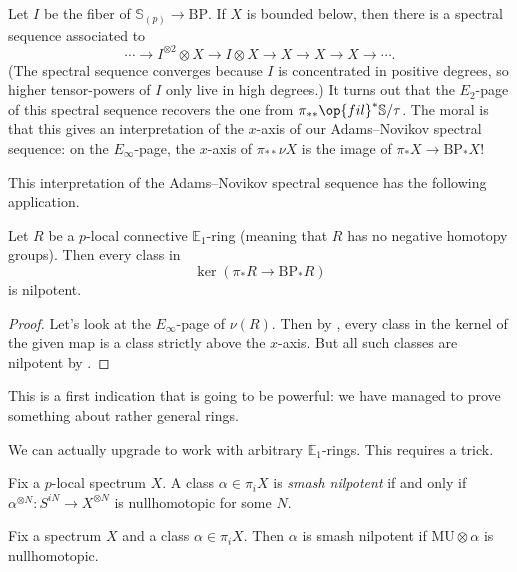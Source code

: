 \documentclass[../notes.tex]{subfiles}
\begin{document}
\begin{remark} \label{rem:x-axis-adams-novikov}
	Let $I$ be the fiber of $\mathbb S_{(p)}\to\mathrm{BP}$. If $X$ is bounded below, then there is a spectral sequence associated to
	\[\cdots\to I^{\otimes2}\otimes X\to I\otimes X\to X\to X\to X\to\cdots.\]
	(The spectral sequence converges because $I$ is concentrated in positive degrees, so higher tensor-powers of $I$ only live in high degrees.) It turns out that the $E_2$-page of this spectral sequence recovers the one from $\pi_{**}\op{fil}^*\mathbb S/\tau$. The moral is that this gives an interpretation of the $x$-axis of our Adams--Novikov spectral sequence: on the $E_\infty$-page, the $x$-axis of $\pi_{**}\nu X$ is the image of $\pi_*X\to\mathrm{BP}_*X$!
\end{remark}
This interpretation of the Adams--Novikov spectral sequence has the following application.
\begin{corollary} \label{cor:connective-to-nilpotent-thing}
	Let $R$ be a $p$-local connective $\mathbb E_1$-ring (meaning that $R$ has no negative homotopy groups). Then every class in
	\[\ker(\pi_*R\to\mathrm{BP}_*R)\]
	is nilpotent.
\end{corollary}
\begin{proof}
	Let's look at the $E_\infty$-page of $\nu(R)$. Then by , every class in the kernel of the given map is a class strictly above the $x$-axis. But all such classes are nilpotent by .
\end{proof}
\begin{remark}
	This is a first indication that  is going to be powerful: we have managed to prove something about rather general rings.
\end{remark}
We can actually upgrade  to work with arbitrary $\mathbb E_1$-rings. This requires a trick.
\begin{definition}
	Fix a $p$-local spectrum $X$. A class $\alpha\in\pi_iX$ is \textit{smash nilpotent} if and only if $\alpha^{\otimes N}\colon S^{iN}\to X^{\otimes N}$ is nullhomotopic for some $N$.
\end{definition}
\begin{proposition}
	Fix a spectrum $X$ and a class $\alpha\in\pi_iX$. Then $\alpha$ is smash nilpotent if $\mathrm{MU}\otimes\alpha$ is nullhomotopic.
\end{proposition}
\end{document}
